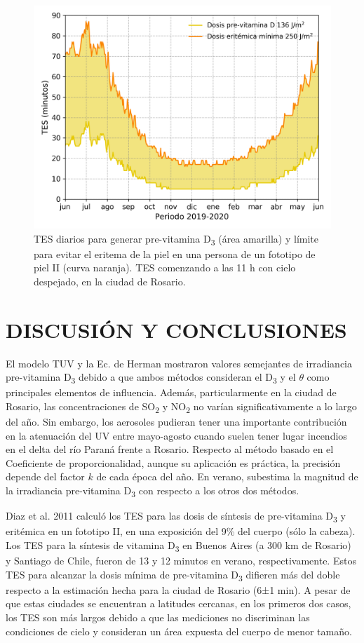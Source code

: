 \documentclass[10pt,twocolumn]{article}
\begin{document}
\begin{figure}[ht]
  \centering
  \includegraphics[scale=0.47]{dosis_vitamin.png}
  \caption{TES diarios para generar pre-vitamina D\textsubscript{3} (área amarilla) y límite para evitar el eritema de la piel en una persona de un fototipo de piel II (curva naranja). TES comenzando a las 11 h con cielo despejado, en la ciudad de Rosario.}
  \label{fig:TES}
\end{figure}

\section{DISCUSIÓN Y CONCLUSIONES}
El modelo TUV y la Ec. de Herman mostraron valores semejantes de irradiancia pre-vitamina D\textsubscript{3} debido a que ambos métodos consideran el D\textsubscript{3} y el $\theta$ como principales elementos de influencia. Además, particularmente en la ciudad de Rosario, las concentraciones de SO\textsubscript{2} y NO\textsubscript{2} no varían significativamente a lo largo del año. Sin embargo, los aerosoles pudieran tener una importante contribución en la atenuación del UV entre mayo-agosto cuando suelen tener lugar incendios en el delta del río Paraná frente a Rosario.\cite{Madronich1987} Respecto al método basado en el Coeficiente de proporcionalidad, aunque su aplicación es práctica, la precisión depende del factor $k$ de cada época del año. En verano, subestima la magnitud de la irradiancia pre-vitamina D\textsubscript{3} con respecto a los otros dos métodos.

Diaz et al. 2011 calculó los TES para las dosis de síntesis de pre-vitamina D\textsubscript{3} y eritémica en un fototipo II, en una exposición del 9\% del cuerpo (sólo la cabeza). Los TES para la síntesis de vitamina D\textsubscript{3} en Buenos Aires (a 300 km de Rosario) y Santiago de Chile, fueron de 13 y 12 minutos en verano, respectivamente.\cite{IPINA2012966} Estos TES para alcanzar la dosis mínima de pre-vitamina D\textsubscript{3} difieren más del doble respecto a la estimación hecha para la ciudad de Rosario (6±1 min). A pesar de que estas ciudades se encuentran a latitudes cercanas, en los primeros dos casos, los TES son más largos debido a que las mediciones no discriminan las condiciones de cielo y consideran un área expuesta del cuerpo de menor tamaño.
\end{document}
